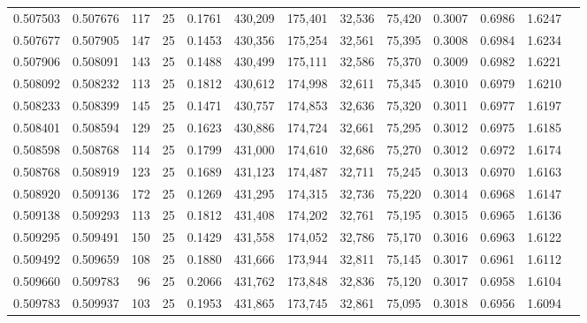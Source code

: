\begin{tabular}{rrrrrrrrrrrrr}
0.507503 & 0.507676 &   117 &  25 &                                     0.1761 & 430,209 & 175,401 &  32,536 &  75,420 & 0.3007 & 0.6986 & 1.6247 \\
0.507677 & 0.507905 &   147 &  25 &                                     0.1453 & 430,356 & 175,254 &  32,561 &  75,395 & 0.3008 & 0.6984 & 1.6234 \\
0.507906 & 0.508091 &   143 &  25 &                                     0.1488 & 430,499 & 175,111 &  32,586 &  75,370 & 0.3009 & 0.6982 & 1.6221 \\
0.508092 & 0.508232 &   113 &  25 &                                     0.1812 & 430,612 & 174,998 &  32,611 &  75,345 & 0.3010 & 0.6979 & 1.6210 \\
0.508233 & 0.508399 &   145 &  25 &                                     0.1471 & 430,757 & 174,853 &  32,636 &  75,320 & 0.3011 & 0.6977 & 1.6197 \\
0.508401 & 0.508594 &   129 &  25 &                                     0.1623 & 430,886 & 174,724 &  32,661 &  75,295 & 0.3012 & 0.6975 & 1.6185 \\
0.508598 & 0.508768 &   114 &  25 &                                     0.1799 & 431,000 & 174,610 &  32,686 &  75,270 & 0.3012 & 0.6972 & 1.6174 \\
0.508768 & 0.508919 &   123 &  25 &                                     0.1689 & 431,123 & 174,487 &  32,711 &  75,245 & 0.3013 & 0.6970 & 1.6163 \\
0.508920 & 0.509136 &   172 &  25 &                                     0.1269 & 431,295 & 174,315 &  32,736 &  75,220 & 0.3014 & 0.6968 & 1.6147 \\
0.509138 & 0.509293 &   113 &  25 &                                     0.1812 & 431,408 & 174,202 &  32,761 &  75,195 & 0.3015 & 0.6965 & 1.6136 \\
0.509295 & 0.509491 &   150 &  25 &                                     0.1429 & 431,558 & 174,052 &  32,786 &  75,170 & 0.3016 & 0.6963 & 1.6122 \\
0.509492 & 0.509659 &   108 &  25 &                                     0.1880 & 431,666 & 173,944 &  32,811 &  75,145 & 0.3017 & 0.6961 & 1.6112 \\
0.509660 & 0.509783 &    96 &  25 &                                     0.2066 & 431,762 & 173,848 &  32,836 &  75,120 & 0.3017 & 0.6958 & 1.6104 \\
0.509783 & 0.509937 &   103 &  25 &                                     0.1953 & 431,865 & 173,745 &  32,861 &  75,095 & 0.3018 & 0.6956 & 1.6094 \\

\end{tabular}
